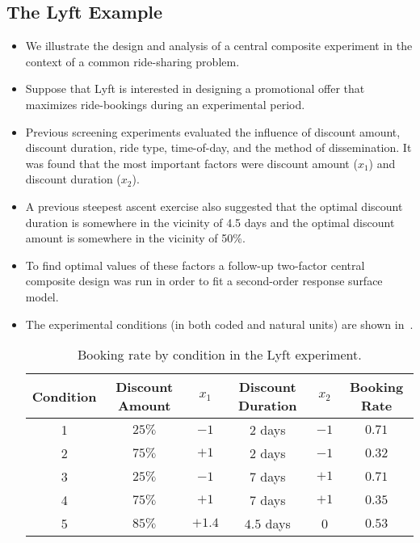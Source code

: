 \subsection{The Lyft Example}
\begin{itemize}
    \item We illustrate the design and analysis of a central composite experiment in the context of a common
          ride-sharing problem.
    \item Suppose that Lyft is interested in designing a promotional offer that maximizes ride-bookings during
          an experimental period.
    \item Previous screening experiments evaluated the influence of discount amount, discount duration, ride
          type, time-of-day, and the method of dissemination. It was found that the most important factors
          were discount amount ($ x_1 $) and discount duration ($ x_2 $).
    \item A previous steepest ascent exercise also suggested that the optimal discount duration is somewhere in
          the vicinity of 4.5 days and the optimal discount amount is somewhere in the vicinity of 50\%.
    \item To find optimal values of these factors a follow-up two-factor central composite design was run in order
          to fit a second-order response surface model.
    \item The experimental conditions (in both coded and natural units) are shown in~.
          \begin{table}[!htbp]
              \centering
              \caption{Booking rate by condition in the Lyft experiment.}\label{tab:Lyft}
              \begin{tabular}{cccccc}
                  \toprule Condition & Discount Amount & $x_{1}$ & Discount Duration & $x_{2}$ & Booking Rate \\
                  \midrule 1         & $25 \%$         & $-1$    & 2 days            & $-1$    & $0.71$       \\
                  2                  & $75 \%$         & $+1$    & 2 days            & $-1$    & $0.32$       \\
                  3                  & $25 \%$         & $-1$    & 7 days            & $+1$    & $0.71$       \\
                  4                  & $75 \%$         & $+1$    & 7 days            & $+1$    & $0.35$       \\
                  5                  & $85 \%$         & $+1.4$  & $4.5$ days        & 0       & $0.53$       \\

\end{tabular}
\end{table}
\end{itemize}
